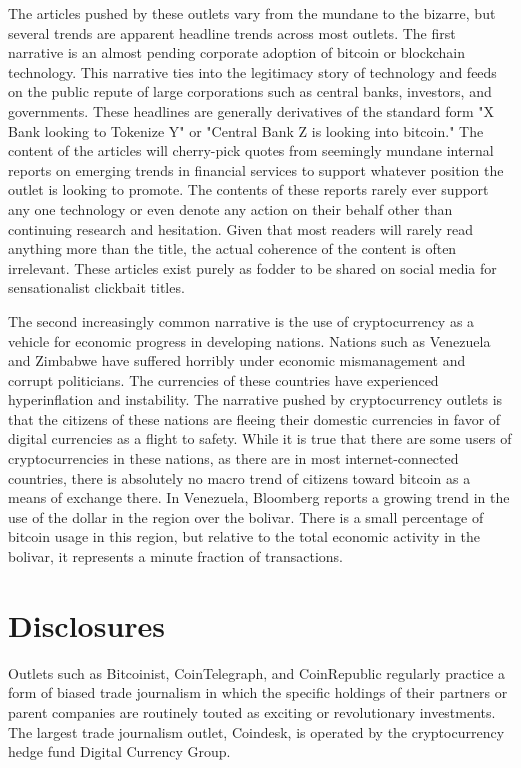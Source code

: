 The articles pushed by these outlets vary from the mundane to the bizarre, but
several trends are apparent headline trends across most outlets. The first
narrative is an almost pending corporate adoption of bitcoin or blockchain
technology. This narrative ties into the legitimacy story of technology and
feeds on the public repute of large corporations such as central banks,
investors, and governments. These headlines are generally derivatives of the
standard form "X Bank looking to Tokenize Y" or "Central Bank Z is looking into
bitcoin." The content of the articles will cherry-pick quotes from seemingly
mundane internal reports on emerging trends in financial services to support
whatever position the outlet is looking to promote. The contents of these
reports rarely ever support any one technology or even denote any action on
their behalf other than continuing research and hesitation. Given that most
readers will rarely read anything more than the title, the actual coherence of
the content is often irrelevant. These articles exist purely as fodder to be
shared on social media for sensationalist clickbait titles.

The second increasingly common narrative is the use of cryptocurrency as a
vehicle for economic progress in developing nations. Nations such as Venezuela
and Zimbabwe have suffered horribly under economic mismanagement and corrupt
politicians. The currencies of these countries have experienced hyperinflation
and instability. The narrative pushed by cryptocurrency outlets is that the
citizens of these nations are fleeing their domestic currencies in favor of
digital currencies as a flight to safety. While it is true that there are some
users of cryptocurrencies in these nations, as there are in most
internet-connected countries, there is absolutely no macro trend
\cite{ellsworth_special_2018} of citizens toward bitcoin as a means of exchange
there.  In Venezuela, Bloomberg \cite{vasquez_there_2019} reports a growing
trend in the use of the dollar in the region over the bolivar. There is a small
percentage of bitcoin usage in this region, but relative to the total economic
activity in the bolivar, it represents a minute fraction of transactions.


\section{Disclosures}

Outlets such as Bitcoinist, CoinTelegraph, and CoinRepublic regularly practice a
form of biased trade journalism in which the specific holdings of their partners
or parent companies are routinely touted as exciting or revolutionary
investments. The largest trade journalism outlet, Coindesk, is operated by the
cryptocurrency hedge fund Digital Currency Group.

